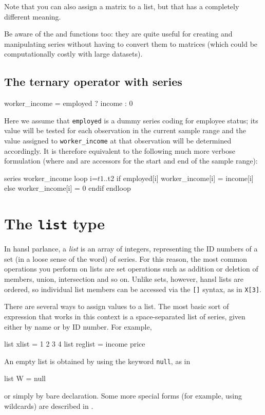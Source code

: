 Note that you can also assign a matrix to a list, but that has a
completely different meaning.

Be aware of the  and  functions too: they are
quite useful for creating and manipulating series without having to
convert them to matrices (which could be computationally costly with
large datasets).


\subsection{The ternary operator with series}

\begin{code}
  worker_income = employed ? income : 0
\end{code}

Here we assume that \texttt{employed} is a dummy series coding for
employee status; its value will be tested for each observation in the
current sample range and the value assigned to \texttt{worker\_income}
at that observation will be determined accordingly. It is therefore
equivalent to the following much more verbose formulation (where
 and  are accessors for the start and end of the
sample range):
\begin{code}
series worker_income
loop i=$t1..$t2
    if employed[i]
        worker_income[i] = income[i]
    else
        worker_income[i] = 0
    endif
endloop
\end{code}

\section{The \texttt{list} type}
\label{sec:lists}
 
In hansl parlance, a \textit{list} is an array of integers,
representing the ID numbers of a set (in a loose sense of the word) of
series.  For this reason, the most common operations you perform on
lists are set operations such as addition or deletion of members,
union, intersection and so on. Unlike sets, however, hansl lists are
ordered, so individual list members can be accessed via the
\texttt{[]} syntax, as in \texttt{X[3]}.

There are several ways to assign values to a list.  The most basic
sort of expression that works in this context is a space-separated
list of series, given either by name or by ID number.  For example,
\begin{code}
list xlist = 1 2 3 4
list reglist = income price 
\end{code}
An empty list is obtained by using the keyword \texttt{null}, as in
\begin{code}
list W = null  
\end{code}
or simply by bare declaration. Some more special forms (for example,
using wildcards) are described in \GUG.

